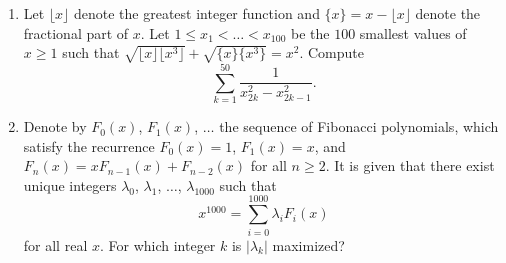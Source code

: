 \documentclass[10pt]{article}
\begin{document}
\begin{enumerate}
\item Let $\lfloor x\rfloor$ denote the greatest integer function and $\{x\}=x-\lfloor x\rfloor$ denote the fractional part of $x$.  Let $1\leq x_1<\ldots<x_{100}$ be the $100$ smallest values of $x\geq 1$ such that $\sqrt{\lfloor x\rfloor\lfloor  x^3\rfloor}+\sqrt{\{x\}\{x^3\}}=x^2.$ Compute \[\sum_{k=1}^{50}\dfrac{1}{x_{2k}^2-x_{2k-1}^2}.\]

\item Denote by $F_0(x)$, $F_1(x)$, $\ldots$ the sequence of Fibonacci polynomials, which satisfy the recurrence $F_0(x)=1$, $F_1(x)=x$, and $F_n(x)=xF_{n-1}(x)+F_{n-2}(x)$ for all $n\geq 2$. %
It is given that there exist unique integers $\lambda_0$, $\lambda_1$, $\ldots$, $\lambda_{1000}$ such that \[x^{1000}=\sum_{i=0}^{1000}\lambda_iF_i(x)\] for all real $x$.  For which integer $k$ is $|\lambda_k|$ maximized?

\end{enumerate}
\end{document}
